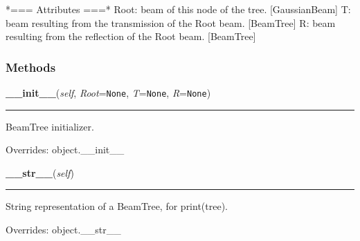 *=== Attributes ===* Root: beam of this node of the tree. [GaussianBeam] T:
beam resulting from the transmission of the Root beam. [BeamTree] R: beam 
resulting from the reflection of the Root beam. [BeamTree]



  \subsubsection{Methods}

    \vspace{0.5ex}

\hspace{.8\funcindent}\begin{boxedminipage}{\funcwidth}

    \raggedright \textbf{\_\_init\_\_}(\textit{self}, \textit{Root}={\tt None}, \textit{T}={\tt None}, \textit{R}={\tt None})

    \vspace{-1.5ex}

    \rule{\textwidth}{0.5\fboxrule}
\setlength{\parskip}{2ex}
    BeamTree initializer.

\setlength{\parskip}{1ex}
      Overrides: object.\_\_init\_\_

    \end{boxedminipage}

    \vspace{0.5ex}

\hspace{.8\funcindent}\begin{boxedminipage}{\funcwidth}

    \raggedright \textbf{\_\_str\_\_}(\textit{self})

    \vspace{-1.5ex}

    \rule{\textwidth}{0.5\fboxrule}
\setlength{\parskip}{2ex}
    String representation of a BeamTree, for print(tree).

\setlength{\parskip}{1ex}
      Overrides: object.\_\_str\_\_

    \end{boxedminipage}

    \label{theia:tree:beamtree:BeamTree:lines}

